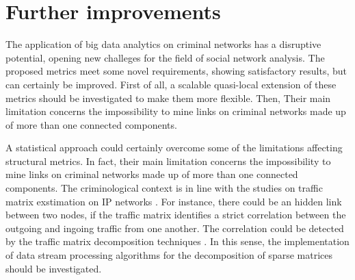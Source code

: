 \section{Further improvements}
\label{sec:further-improvements}

The application of big data analytics on criminal networks has a disruptive potential, opening new challeges for the field of social network analysis.
The proposed metrics meet some novel requirements, showing satisfactory results, but can certainly be improved. 
First of all, a scalable quasi-local extension of these metrics should be investigated to make them more flexible. 
Then, Their main limitation concerns the impossibility to mine links on criminal networks made up of more than one connected components. 

A statistical approach could certainly overcome some of the limitations affecting structural metrics. In fact, their main limitation concerns the impossibility to mine links on criminal networks made up of more than one connected components.  
The criminological context is in line with the studies on traffic matrix exstimation on IP networks  \cite{medina2002traffic,benameur2004traffic,papagiannaki2004distributed}. 
For instance, there could be an hidden link between two nodes, if the traffic matrix identifies a strict correlation between the outgoing and ingoing traffic from one another. 
The correlation could be detected by the traffic matrix decomposition techniques \cite{elgamal2015analysis,jiang2015covariance}. 
In this sense, the implementation of data stream processing algorithms for the decomposition of sparse matrices should be investigated.